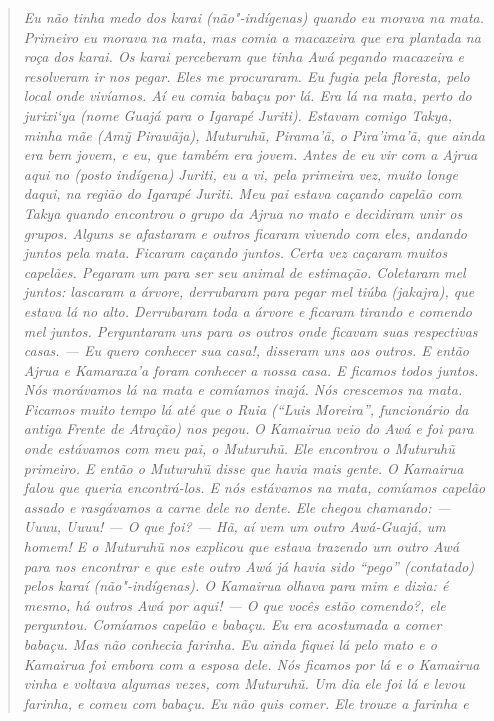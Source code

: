 \begin{quote}
\emph{Eu não tinha medo dos karai (não"-indígenas) quando eu morava na
mata. Primeiro eu morava na mata, mas comia a macaxeira que era plantada
na roça dos karai. Os karai perceberam que tinha Awá pegando macaxeira e
resolveram ir nos pegar. Eles me procuraram. Eu fugia pela floresta,
pelo local onde vivíamos. Aí eu comia babaçu por lá. Era lá na mata,
perto do jurixi`ya (nome Guajá para o Igarapé Juriti). Estavam comigo
Takya, minha mãe (Amỹ Pirawãja), Muturuhũ, Pirama'ã, o Pira'ima'ã, que
ainda era bem jovem, e eu, que também era jovem. Antes de eu vir com a
Ajrua aqui no (posto indígena) Juriti, eu a vi, pela primeira vez, muito
longe daqui, na região do Igarapé Juriti. Meu pai estava caçando capelão
com Takya quando encontrou o grupo da Ajrua no mato e decidiram unir os
grupos. Alguns se afastaram e outros ficaram vivendo com eles, andando
juntos pela mata. Ficaram caçando juntos. Certa vez caçaram muitos
capelães. Pegaram um para ser seu animal de estimação. Coletaram mel
juntos: lascaram a árvore, derrubaram para pegar mel tiúba (jakajra),
que estava lá no alto. Derrubaram toda a árvore e ficaram tirando e
comendo mel juntos. Perguntaram uns para os outros onde ficavam suas
respectivas casas. --- Eu quero conhecer sua casa!, disseram uns aos
outros. E então Ajrua e Kamaraxa'a foram conhecer a nossa casa. E
ficamos todos juntos. Nós morávamos lá na mata e comíamos inajá. Nós
crescemos na mata. Ficamos muito tempo lá até que o Ruia (``Luis
Moreira'', funcionário da antiga Frente de Atração) nos pegou.} \emph{O
Kamairua veio do Awá e foi para onde estávamos com meu pai, o Muturuhũ.
Ele encontrou o Muturuhũ primeiro. E então o Muturuhũ disse que havia
mais gente. O Kamairua falou que queria encontrá-los. E nós estávamos na
mata, comíamos capelão assado e rasgávamos a carne dele no dente. Ele
chegou chamando: ---Uuuu, Uuuu! --- O que foi? --- Hã, aí vem um outro
Awá-Guajá, um homem! E o Muturuhũ nos explicou que estava trazendo um
outro Awá para nos encontrar e que este outro Awá já havia sido ``pego''
(contatado) pelos karaí (não"-indígenas). O Kamairua olhava para mim e
dizia: é mesmo, há outros Awá por aqui! --- O que vocês estão comendo?,
ele perguntou. Comíamos capelão e babaçu. Eu era acostumada a comer
babaçu. Mas não conhecia farinha. Eu ainda fiquei lá pelo mato e o
Kamairua foi embora com a esposa dele. Nós ficamos por lá e o Kamairua
vinha e voltava algumas vezes, com Muturuhũ. Um dia ele foi lá e levou
farinha, e comeu com babaçu. Eu não quis comer. Ele trouxe a farinha e
}
\end{quote}

